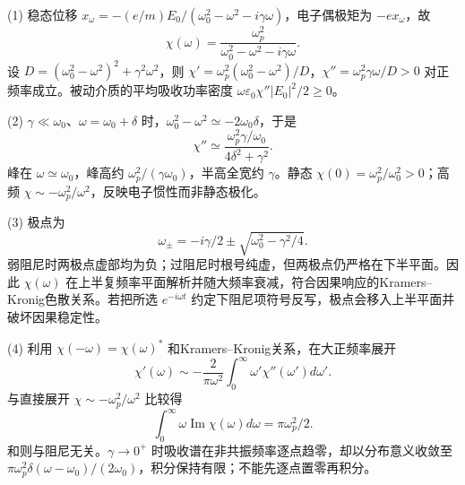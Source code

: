 (1) 稳态位移 \(x_\omega=-(e/m)E_0/(\omega_0^2-\omega^2-i\gamma\omega)\)，电子偶极矩为 \(-ex_\omega\)，故
\[
\boxed{\chi(\omega)=\frac{\omega_p^2}{\omega_0^2-\omega^2-i\gamma\omega}}.
\]
设 \(D=(\omega_0^2-\omega^2)^2+\gamma^2\omega^2\)，则 \(\chi'=\omega_p^2(\omega_0^2-\omega^2)/D\)，\(\chi''=\omega_p^2\gamma\omega/D>0\) 对正频率成立。被动介质的平均吸收功率密度 \(\omega\varepsilon_0\chi''|E_0|^2/2\ge0\)。

(2) \(\gamma\ll\omega_0\)、\(\omega=\omega_0+\delta\) 时，\(\omega_0^2-\omega^2\simeq-2\omega_0\delta\)，于是
\[
\chi''\simeq\frac{\omega_p^2\gamma/\omega_0}{4\delta^2+\gamma^2}.
\]
峰在 \(\omega\simeq\omega_0\)，峰高约 \(\omega_p^2/(\gamma\omega_0)\)，半高全宽约 \(\gamma\)。静态 \(\chi(0)=\omega_p^2/\omega_0^2>0\)；高频 \(\chi\sim-\omega_p^2/\omega^2\)，反映电子惯性而非静态极化。

(3) 极点为
\[
\omega_\pm=-i\gamma/2\pm\sqrt{\omega_0^2-\gamma^2/4}.
\]
弱阻尼时两极点虚部均为负；过阻尼时根号纯虚，但两极点仍严格在下半平面。因此 \(\chi(\omega)\) 在上半复频率平面解析并随大频率衰减，符合因果响应的Kramers–Kronig色散关系。若把所选 \(e^{-i\omega t}\) 约定下阻尼项符号反写，极点会移入上半平面并破坏因果稳定性。

(4) 利用 \(\chi(-\omega)=\chi(\omega)^*\) 和Kramers–Kronig关系，在大正频率展开
\[
\chi'(\omega)\sim-\frac2{\pi\omega^2}\int_0^\infty\omega'\chi''(\omega')d\omega'.
\]
与直接展开 \(\chi\sim-\omega_p^2/\omega^2\) 比较得
\[
\boxed{\int_0^\infty\omega\operatorname{Im}\chi(\omega)d\omega=\pi\omega_p^2/2}.
\]
和则与阻尼无关。\(\gamma\to0^+\) 时吸收谱在非共振频率逐点趋零，却以分布意义收敛至 \(\pi\omega_p^2\delta(\omega-\omega_0)/(2\omega_0)\)，积分保持有限；不能先逐点置零再积分。
